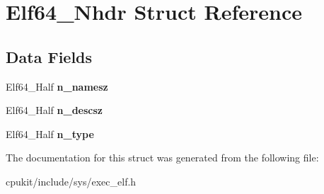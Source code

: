 \hypertarget{structElf64__Nhdr}{}\section{Elf64\+\_\+\+Nhdr Struct Reference}
\label{structElf64__Nhdr}
\subsection*{Data Fields}
\begin{DoxyCompactItemize}
\item 
\mbox{\label{structElf64__Nhdr_aba6fc36193ee5db0c88c936d0fd53ade}} 
Elf64\+\_\+\+Half {\bfseries n\+\_\+namesz}
\item 
\mbox{\label{structElf64__Nhdr_a0c490f55f594085ce200a1d9c93aaf42}} 
Elf64\+\_\+\+Half {\bfseries n\+\_\+descsz}
\item 
\mbox{\label{structElf64__Nhdr_a9c2b9e53d821732fdccd4a3a8115ebb2}} 
Elf64\+\_\+\+Half {\bfseries n\+\_\+type}
\end{DoxyCompactItemize}


The documentation for this struct was generated from the following file\+:\begin{DoxyCompactItemize}
\item 
cpukit/include/sys/exec\+\_\+elf.\+h\end{DoxyCompactItemize}
